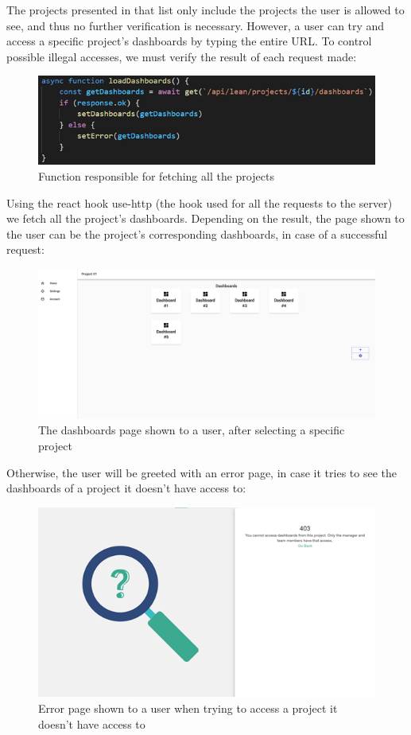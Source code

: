 \documentclass[a4paper,twoside,10pt]{report}
\begin{document}
The projects presented in that list only include the projects the user is allowed to see, and thus no further verification is necessary.
However, a user can try and access a specific project’s dashboards by typing the entire URL. To control possible illegal accesses, we must verify the result of each request made:
\begin{figure}[h!]
\center
    \includegraphics[width=\textwidth]{load-projects.png}
\caption{Function responsible for fetching all the projects}
\end{figure}

Using the react hook use-http (the hook used for all the requests to the server) we fetch all the project’s dashboards.
Depending on the result, the page shown to the user can be the project’s corresponding dashboards, in case of a successful request:
\begin{figure}[h!]
\center
    \includegraphics[width=\textwidth]{dashboardsPage.png}
\caption{The dashboards page shown to a user, after selecting a specific project}
\end{figure}

\newpage
Otherwise, the user will be greeted with an error page, in case it tries to see the dashboards of a project it doesn't have access to:

\begin{figure}[h!]
\center
    \includegraphics[width=\textwidth]{error-403.png}
\caption{Error page shown to a user when trying to access a project it doesn't have access to}
\end{figure}
\end{document}
